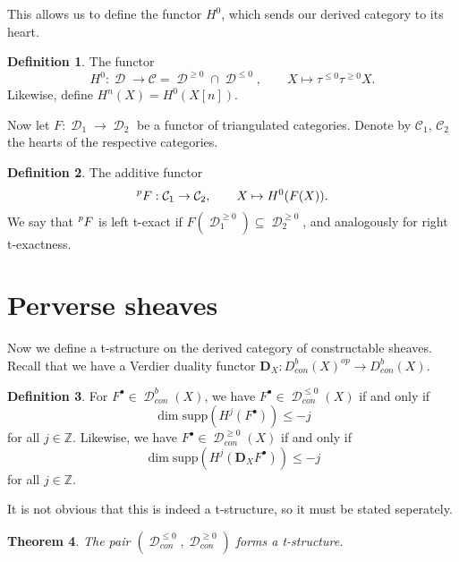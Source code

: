 \documentclass[12pt]{amsart}
\newcommand{\Z}{\mathbb{Z}}
\DeclareMathOperator{\D}{\mathcal{D}}
\newtheorem{theorem}{Theorem}[section]
\theoremstyle{definition}
\newtheorem{definition}[theorem]{Definition}
\theoremstyle{remark}
\numberwithin{equation}{section}
\begin{document}
This allows us to define the functor $H^0$, which sends our derived category to its heart.
\begin{definition}
    The functor
    \begin{equation*}
        H^0: \D \to \mathcal{C} = \D^{\geq 0} \cap \D^{\leq 0}, \qquad
        X \mapsto \tau^{\leq 0} \tau^{\geq 0}X.
    \end{equation*}
    Likewise, define $H^n(X) = H^0(X[n])$.
\end{definition}
Now let $F: \D_1 \to \D_2$ be a functor of triangulated categories. Denote by $\mathcal{C}_1$, $\mathcal{C}_2$ the hearts of the respective categories.
\begin{definition}
    The additive functor
    \begin{equation*}
        \prescript{p}{}{F}: \mathcal{C}_1 \to \mathcal{C}_2,\qquad
        X \mapsto H^0(F(X)).
    \end{equation*}
    We say that $\prescript{p}{}{F}$ is left t-exact if $F(\D_1^{\geq 0}) \subseteq \D_2^{\geq 0}$, and analogously for right t-exactness.
\end{definition}

\section{Perverse sheaves}

Now we define a t-structure on the derived category of constructable sheaves. Recall that we have a Verdier duality functor $\mathbf{D}_X: D^b_{con}(X)^{op} \to D^b_{con}(X)$.
\begin{definition}
    For $F^\bullet \in \D^b_{con}(X)$, we have $F^\bullet \in \D^{\leq 0}_{con}(X)$ if and only if 
    \[\dim \text{supp}( H^j(F^\bullet)) \leq -j\] for all $j \in \Z$. 
    Likewise, we have $F^\bullet \in \D^{\geq 0}_{con}(X)$ if and only if 
    \[\dim \text{supp}( H^j(\mathbf{D}_X F^\bullet)) \leq -j\] for all $j \in \Z$.
\end{definition}

It is not obvious that this is indeed a t-structure, so it must be stated seperately.
\begin{theorem}
    The pair $(\D_{con}^{\leq 0}, \D_{con}^{\geq 0})$ forms a t-structure. 
\end{theorem}
\end{document}
